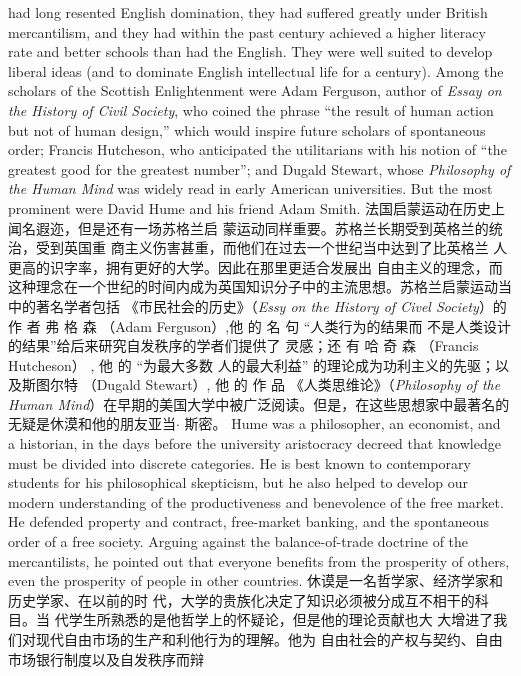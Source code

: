 \begin{paracol}{2}
had long resented English domination, they had suffered
greatly under British mercantilism, and they had within the
past century achieved a higher literacy rate and better schools
than had the English. They were well suited to develop liberal
ideas (and to dominate English intellectual life for a century).
Among the scholars of the Scottish Enlightenment were Adam
Ferguson, author of \textit{Essay on the History of Civil Society}, who
coined the phrase ``the result of human action but not of human
design,'' which would inspire future scholars of spontaneous
order; Francis Hutcheson, who anticipated the utilitarians with
his notion of ``the greatest good for the greatest number''; and
Dugald Stewart, whose \textit{Philosophy of the Human Mind} was widely
read in early American universities. But the most prominent
were David Hume and his friend Adam Smith.
\switchcolumn
法国启蒙运动在历史上闻名遐迩，但是还有一场苏格兰启
蒙运动同样重要。苏格兰长期受到英格兰的统治，受到英国重
商主义伤害甚重，而他们在过去一个世纪当中达到了比英格兰
人更高的识字率，拥有更好的大学。因此在那里更适合发展出
自由主义的理念，而这种理念在一个世纪的时间内成为英国知识分子中的主流思想。苏格兰启蒙运动当中的著名学者包括
《市民社会的历史》（\textit{Essy on the History of Civel Society}）的作
者 弗 格 森 （Adam  Ferguson）,他 的 名 句 “人类行为的结果而
不是人类设计的结果”给后来研究自发秩序的学者们提供了
灵感；还 有 哈 奇 森 （Francis  Hutcheson） , 他 的 “为最大多数
人的最大利益” 的理论成为功利主义的先驱；以及斯图尔特
（Dugald  Stewart）, 他 的 作 品 《人类思维论》（\textit{Philosophy of the Human Mind}）在早期的美国大学中被广泛阅读。但是，在这些思想家中最著名的无疑是休漠和他的朋友亚当$\cdot$ 斯密。
\switchcolumn*
Hume was a philosopher, an economist, and a historian, in
the days before the university aristocracy decreed that knowledge must be divided into discrete categories. He is best known to contemporary students for his philosophical skepticism, but he also helped to develop our modern understanding of the productiveness and benevolence of the free market. He defended
property and contract, free-market banking, and the spontaneous order of a free society. Arguing against the balance-of-trade doctrine of the mercantilists, he pointed out that everyone
benefits from the prosperity of others, even the prosperity of
people in other countries.
\switchcolumn
休谟是一名哲学家、经济学家和历史学家、在以前的时
代，大学的贵族化决定了知识必须被分成互不相干的科目。当
代学生所熟悉的是他哲学上的怀疑论，但是他的理论贡献也大
大增进了我们对现代自由市场的生产和利他行为的理解。他为
自由社会的产权与契约、自由市场银行制度以及自发秩序而辩

\end{paracol}
